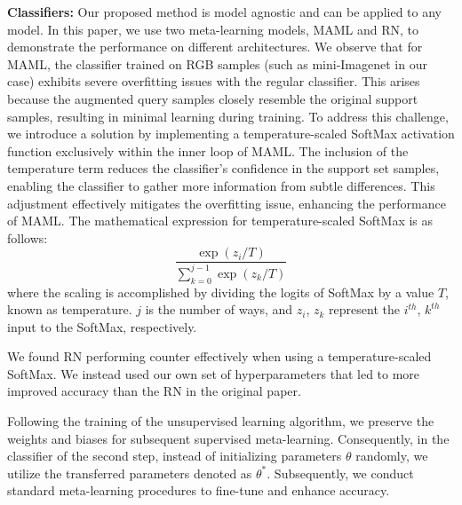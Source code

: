 \textbf{Classifiers:} Our proposed method is model agnostic and can be applied to any model. In this paper, we use two meta-learning models, MAML and RN, to demonstrate the performance on different architectures.  We observe that for MAML, the classifier trained on RGB samples (such as mini-Imagenet in our case) exhibits severe overfitting issues with the regular classifier. This arises because the augmented query samples closely resemble the original support samples, resulting in minimal learning during training. To address this challenge, we introduce a solution by implementing a temperature-scaled SoftMax activation function exclusively within the inner loop of MAML. The inclusion of the temperature term reduces the classifier's confidence in the support set samples, enabling the classifier to gather more information from subtle differences. This adjustment effectively mitigates the overfitting issue, enhancing the performance of MAML. The mathematical expression for temperature-scaled SoftMax is as follows:
\begin{equation}
\frac{\exp(z_{i}/T)}{\sum_{k=0}^{j-1} \exp(z_{k}/T)}
\end{equation}
where the scaling is accomplished by dividing the logits of SoftMax by a value \(T\), known as temperature. \(j\) is the number of ways, and \(z_{i}\), \(z_{k}\) represent the \(i^{th}\), \(k^{th}\) input to the SoftMax, respectively.

We found RN performing counter effectively when using a temperature-scaled SoftMax. We instead used our own set of hyperparameters that led to more improved accuracy than the RN in the original paper.

Following the training of the unsupervised learning algorithm, we preserve the weights and biases for subsequent supervised meta-learning. Consequently, in the classifier of the second step, instead of initializing parameters $\theta$ randomly, we utilize the transferred parameters denoted as $\theta^{*}$. Subsequently, we conduct standard meta-learning procedures to fine-tune and enhance accuracy.

